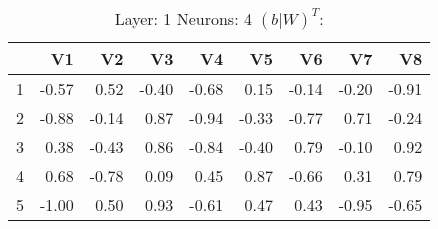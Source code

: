 \begin{table}[ht]
\centering
\begin{tabular}{rrrrrrrrr}
  \hline
 & V1 & V2 & V3 & V4 & V5 & V6 & V7 & V8 \\ 
  \hline
1 & -0.57 & 0.52 & -0.40 & -0.68 & 0.15 & -0.14 & -0.20 & -0.91 \\ 
  2 & -0.88 & -0.14 & 0.87 & -0.94 & -0.33 & -0.77 & 0.71 & -0.24 \\ 
  3 & 0.38 & -0.43 & 0.86 & -0.84 & -0.40 & 0.79 & -0.10 & 0.92 \\ 
  4 & 0.68 & -0.78 & 0.09 & 0.45 & 0.87 & -0.66 & 0.31 & 0.79 \\ 
  5 & -1.00 & 0.50 & 0.93 & -0.61 & 0.47 & 0.43 & -0.95 & -0.65 \\ 
   \hline
\end{tabular}
\caption{Layer: 1 Neurons: 4  $(b|W)^T$: 
} 
\end{table}
